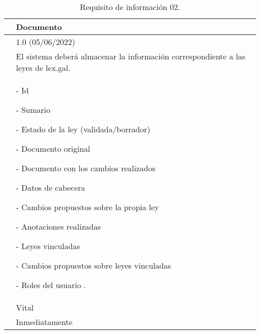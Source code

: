 \begin{table}[H]
\begin{center}
\begin{tabular}{|p{3cm}|p{10cm}|} \hline
\centering {\bf IRQ-02} & Documento  \\ \hline\hline
\centering {\bf Versión} & 1.0 (05/06/2022) \\ \hline
\centering {\bf Descripción} & El sistema deberá almacenar la información correspondiente a las leyes de lex.gal. \\ \hline
\centering {\bf Datos específicos}  & 
- Id

- Sumario

- Estado de la ley (validada/borrador)

- Documento original

- Documento con los cambios realizados

- Datos de cabecera

- Cambios propuestos sobre la propia ley

- Anotaciones realizadas

- Leyes vinculadas

- Cambios propuestos sobre leyes vinculadas

- Roles del usuario
. \\ \hline
\centering {\bf Importancia} & Vital \\ \hline
\centering {\bf Urgencia} & Inmediatamente \\ \hline
\end{tabular}
\caption{Requisito de información 02.}
\label{enlaceIRQ2}
\end{center}
\end{table}